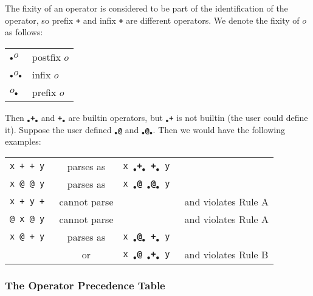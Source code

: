 \documentclass[12pt]{article}
\newcommand{\TT}[1]{{\tt \bfseries #1}}
\begin{document}
\newcommand{\IX}[1]{$_{\bullet}$\TT{#1}$_{\bullet}$}
\newcommand{\RX}[1]{\TT{#1}$_{\bullet}$}
\newcommand{\LX}[1]{$_{\bullet}$\TT{#1}}

The fixity of an operator is considered to be part of
the identification of the operator, so prefix \TT{+}
and infix \TT{+} are different operators.
We denote the fixity of \TT{$o$} as follows:
\begin{center}
\begin{tabular}{ll}
\LX{$o$} & postfix \TT{$o$} \\
\IX{$o$} & infix \TT{$o$} \\
\RX{$o$} & prefix \TT{$o$} \\
\end{tabular}
\end{center}

Then \IX{+} and \RX{+} are builtin operators, but \LX{+}
is not builtin (the user could define it).  Suppose the
user defined \LX{@} and \IX{@}.  Then we would have the
following examples:

\begin{center}
\begin{tabular}{lcll}
\tt x + + y	& parses as & \tt x \IX{+} \RX{+} y \\
\tt x @ @ y	& parses as & \tt x \LX{@} \IX{@} y \\
\tt x + y +	& cannot parse & & and violates Rule A \\
\tt @ x @ y	& cannot parse & & and violates Rule A \\
\tt x @ + y	& parses as & \tt x \IX{@} \RX{+} y \\
		& or        & \tt x \LX{@} \IX{+} y
			    & and violates Rule B \\
\end{tabular}
\end{center}

\subsubsection{The Operator Precedence Table}
\label{THE-OPERATOR-PRECEDENCE-TABLE}
\end{document}
